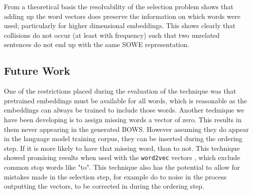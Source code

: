 \documentclass[11pt]{article}
\numberwithin{equation}{section}
\numberwithin{figure}{section}
\theoremstyle{plain}
\theoremstyle{definition}
\begin{document}
From a theoretical basis the resolvability of the selection problem shows that adding up the word vectors does preserve the information on which words were used; particularly for higher dimensional embeddings. This shows clearly that collisions do not occur (at least with frequency) such that two unrelated sentences do not end up with the same SOWE representation. 

\subsection{Future Work}\label{future}
One of the restrictions placed during the evaluation of the technique was that pretrained embeddings must be available for all words, which is reasonable as the embeddings can always be trained to include those words. Another technique we have been developing is to assign missing words a vector of zero. This results in them never appearing in the generated BOWS. However assuming they do appear in the language model training corpus, they can be inserted during the ordering step. If it is more likely to have that missing word, than to not. This technique showed promising results when used with the \texttt{word2vec} vectors \parencite{mikolovSkip}, which exclude common stop words like "to". This technique also has the potential to allow for mistakes made in the selection step, for example do to noise in the process outputting the vectors, to be corrected in during the ordering step.




\printbibliography
	
\end{document}
